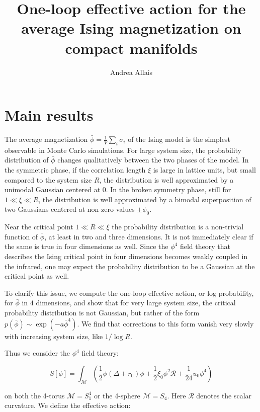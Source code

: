 \documentclass[11pt,a4paper]{article}
\title{One-loop effective action for the average Ising magnetization on compact manifolds}
\author{Andrea Allais}
\begin{document}
\maketitle

\section{Main results}

The average magnetization $\bar{\phi} = \frac{1}{V} \sum_{i} \sigma_i$ of the
Ising model is the simplest observable in Monte Carlo simulations. For large
system size, the probability distribution of $\bar{\phi}$ changes qualitatively
between the two phases of the model. In the symmetric phase, if the
correlation length $\xi$ is large in lattice units, but small compared to the
system size $R$, the distribution is well approximated by a unimodal Gaussian
centered at 0. In the broken symmetry phase, still for $1 \ll \xi \ll R$, the
distribution is well approximated by a bimodal superposition of two 
Gaussians centered at non-zero values $\pm \bar{\phi}_0$. 

Near the critical point $1 \ll R \ll \xi$ the probability distribution is a
non-trivial function of $\bar{\phi}$, at least in two and three dimensions.  It
is not immediately clear if the same is true in four dimensions as well.  Since
the $\phi^4$ field theory that describes the Ising critical point in four
dimensions becomes weakly coupled in the infrared, one may expect the
probability distribution to be a Gaussian at the critical point as well.

To clarify this issue, we compute the one-loop effective action, or log
probability, for $\bar{\phi}$ in $4$ dimensions, and show that for
very large system size, the critical probability distribution is not Gaussian,
but rather of the form $p(\bar{\phi})\sim \exp(-a \bar{\phi}^4)$. We find that
corrections to this form vanish very slowly with increasing system size, like
$1/\log R$.

Thus we consider the $\phi^4$ field theory:

\begin{equation}
  S[\phi] = \int_{\mathcal{M}}\left(
    \frac{1}{2} \phi\left(\Delta + r_0\right)\phi +
    \frac{1}{2} \xi_0 \phi^2 \mathcal{R} +
    \frac{1}{24} u_0 \phi^4\right)
\end{equation}

on both the 4-torus $\mathcal{M} = S_1^4$ or the 4-sphere $\mathcal{M} = S_4$.
Here $\mathcal R$ denotes the scalar curvature. We define the effective action:
\end{document}
